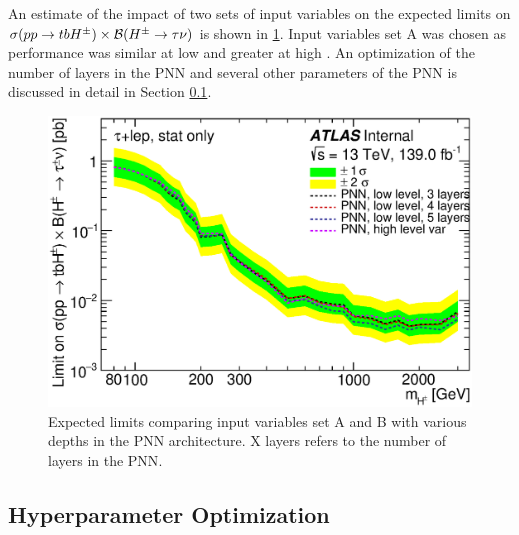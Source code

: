       An estimate of the impact of two sets of input variables on the expected limits on $\sigma(pp\to tbH^{\pm})\times \mathrm{\cal{B}}(H^{\pm} \to \tau \nu)$ is shown in \ref{fig:variable-comparison-limits}. Input variables set A was chosen as performance was similar at low \mHpm and greater at high \mHpm. An optimization of the number of layers in the \gls{PNN} and several other parameters of the \gls{PNN} is discussed in detail in Section \ref{ssec:hpo}.
			\begin{figure}	
				\begin{center}
					\includegraphics[width=.75\textwidth,keepaspectratio=true]{chapters/chapter6_HPlus/images/taulep_limits_PNN_low_lv_vs_high_lv.eps}
				\end{center}
				\caption{Expected limits comparing input variables set A and B with various depths in the \gls{PNN} architecture. X layers refers to the number of layers in the \gls{PNN}. }
				\label{fig:variable-comparison-limits}
			\end{figure}	

		\subsection{Hyperparameter Optimization}\label{ssec:hpo}


